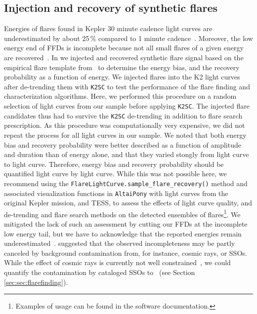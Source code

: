 \documentclass{aa}
\begin{document}
\subsection{Injection and recovery of synthetic flares}
\label{sec:sec:injrec}
Energies of flares found in Kepler 30 minute cadence light curves are underestimated by about 25\,\% compared to 1 minute cadence~\citep{yang_flaresampling_2018}. Moreover, the low energy end of FFDs is incomplete because not all small flares of a given energy are recovered~\citep{davenport_kepler_2016}. In  we injected and recovered synthetic flare signal based on the empirical flare template from~\citet{davenport_kepler_2014} to determine the energy bias, and the recovery probability as a function of energy. We injected flares into the K2 light curves after de-trending them with \texttt{K2SC} to test the performance of the flare finding and characterization algorithms. Here, we performed this procedure on a random selection of light curves from our sample before applying \texttt{K2SC}. The injected flare candidates thus had to survive the \texttt{K2SC} de-trending in addition to flare search prescription. As this procedure was computationally very expensive, we did not repeat the process for all light curves in our sample. We noted that both energy bias and recovery probability were better described as a function of amplitude and duration than of energy alone, and that they varied stongly from light curve to light curve. Therefore, energy bias and recovery probability should be quantified light curve by light curve. While this was not possible here, we recommend using the \texttt{FlareLightCurve.sample\_flare\_recovery()} method and associated visualization functions in \texttt{AltaiPony} with light curves from the original Kepler mission, and TESS, to assess the effects of light curve quality, and de-trending and flare search methods on the detected ensembles of flares\footnote{Examples of usage can be found in the software documentation.}. We mitigated the lack of such an assessment by cutting our FFDs at the incomplete low energy tail, but we have to acknowledge that the reported energies remain underestimated~\citep{yang_flaresampling_2018}. \citet{aschwanden_powerlaws_2015} suggested that the observed incompleteness may be partly canceled by background contamination from, for instance, cosmic rays, or SSOs. While the effect of cosmic rays is currently not well constrained~, we could quantify the contamination by cataloged SSOs to ~(see Section \ref{sec:sec:flarefinding}).
\end{document}
